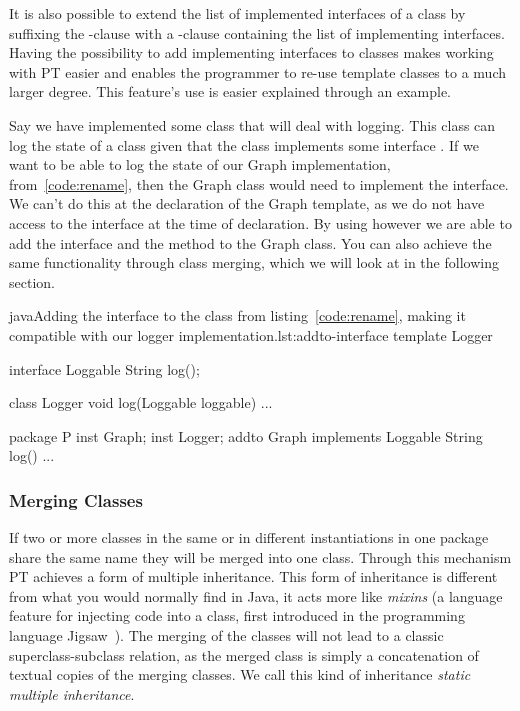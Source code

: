 It is also possible to extend the list of implemented interfaces of a class by suffixing the -clause with a -clause containing the list of implementing interfaces.
Having the possibility to add implementing interfaces to classes makes working with PT easier and enables the programmer to re-use template classes to a much larger degree.
This feature's use is easier explained through an example.

Say we have implemented some class that will deal with logging.
This class can log the state of a class given that the class implements some interface .
If we want to be able to log the state of our Graph implementation, from~\vref{code:rename}, then the Graph class would need to implement the  interface.
We can't do this at the declaration of the Graph template, as we do not have access to the interface at the time of declaration.
By using  however we are able to add the  interface and the  method to the Graph class.
You can also achieve the same functionality through class merging, which we will look at in the following section.

\begin{code}{java}{Adding the  interface to the  class from listing~\vref{code:rename}, making it compatible with our logger implementation.}{lst:addto-interface}
    template Logger {
        interface Loggable {
            String log();
        }

        class Logger {
            void log(Loggable loggable) {
                ...
            }
        }
    }

    package P {
        inst Graph;
        inst Logger;
        addto Graph implements Loggable {
            String log() {
                ...
            }
        }
    }
\end{code}


\subsubsection{Merging Classes}\label{subsubsec:merging-classes}

If two or more classes in the same or in different instantiations in one package share the same name they will be merged into one class.
Through this mechanism PT achieves a form of multiple inheritance.
This form of inheritance is different from what you would normally find in Java, it acts more like \textit{mixins} (a language feature for injecting code into a class, first introduced in the programming language Jigsaw~\cite{jigsaw}).
The merging of the classes will not lead to a classic superclass-subclass relation, as the merged class is simply a concatenation of textual copies of the merging classes.
We call this kind of inheritance \textit{static multiple inheritance}.

